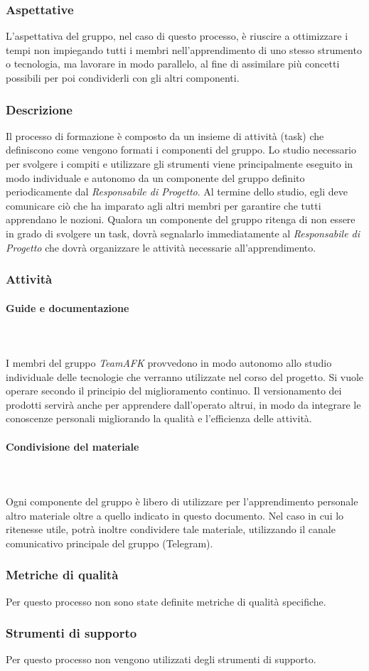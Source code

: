 \subsubsection{Aspettative}
L’aspettativa del gruppo, nel caso di questo processo, è riuscire a ottimizzare i tempi non impiegando tutti i membri nell’apprendimento di uno stesso strumento o tecnologia, ma lavorare in modo parallelo, al fine di assimilare più concetti possibili per poi condividerli con gli altri componenti.

\subsubsection{Descrizione}
Il processo di formazione è composto da un insieme di attività (task) che definiscono come vengono formati i componenti del gruppo. Lo studio necessario per svolgere i compiti e utilizzare gli strumenti viene principalmente eseguito in modo individuale e autonomo da un componente del gruppo definito periodicamente dal \textit{Responsabile di Progetto}. Al termine dello studio, egli deve comunicare ciò che ha imparato agli altri membri per garantire che tutti apprendano le nozioni. Qualora un componente del gruppo ritenga di non essere in grado di svolgere un task, dovrà segnalarlo immediatamente al \textit{Responsabile di Progetto} che dovrà organizzare le attività necessarie all'apprendimento.

\subsubsection{Attività}
\paragraph{Guide e documentazione}\mbox{} \\ \mbox{} \\
I membri del gruppo \textit{TeamAFK} provvedono in modo autonomo allo studio individuale delle tecnologie che verranno utilizzate nel corso del progetto. Si vuole operare secondo il principio del miglioramento continuo. Il versionamento dei prodotti servirà anche per apprendere dall'operato altrui, in modo da integrare le conoscenze personali migliorando la qualità e l'efficienza delle
attività.

\paragraph{Condivisione del materiale}\mbox{} \\ \mbox{} \\
Ogni componente del gruppo è libero di utilizzare per l'apprendimento personale altro materiale oltre a quello indicato in questo documento. Nel caso in cui lo ritenesse utile, potrà inoltre condividere tale materiale, utilizzando il canale comunicativo principale del gruppo (Telegram).

\subsubsection{Metriche di qualità}
Per questo processo non sono state definite metriche di qualità specifiche.

\subsubsection{Strumenti di supporto}
Per questo processo non vengono utilizzati degli strumenti di supporto.